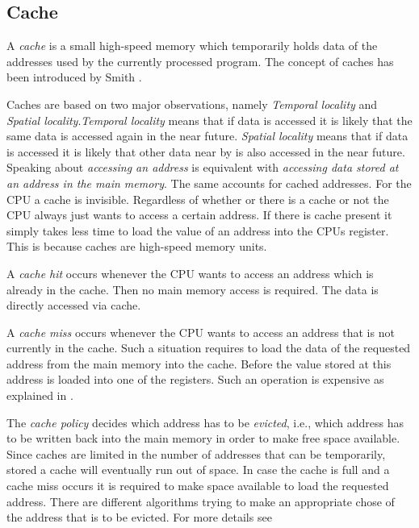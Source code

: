 \documentclass[onecolumn, openright, master, english, signatures]{dbrgrptt}
\begin{document}
\subsection{Cache}
A \emph{cache} is a small high-speed memory which temporarily holds data of the addresses used by the currently processed program. The concept of caches has been introduced by Smith \cite{smith1982cache}.

Caches are based on two major observations, namely \emph{Temporal locality} and \emph{Spatial locality}.\emph{Temporal locality} means that if data is accessed it is likely that the same data is accessed again in the near future. \emph{Spatial locality} means that if data is accessed it is likely that other data near by is also accessed in the near future. Speaking about \emph{accessing an address} is equivalent with \emph{accessing data stored at an address in the main memory}. The same accounts for cached addresses. For the \ac{CPU} a cache is invisible. Regardless of whether or there is a cache or not the \ac{CPU} always just wants to access a certain address. If there is cache present it simply takes less time to load the value of an address into the \ac{CPU}s register. This is because caches are high-speed memory units.

A \emph{cache hit} occurs whenever the \ac{CPU} wants to access an address which is already in the cache. Then no main memory access is required. The data is directly accessed via cache.

A \emph{cache miss} occurs whenever the \ac{CPU} wants to access an address that is not currently in the cache. Such a situation requires to load the data of the requested address from the main memory into the cache. Before the value stored at this address is loaded into one of the registers. Such an operation is expensive as explained in .

The \emph{cache policy} decides which address has to be \emph{evicted}, i.e., which address has to be written back into the main memory in order to make free space available. Since caches are limited in the number of addresses that can be temporarily, stored a cache will eventually run out of space. In case the cache is full and a cache miss occurs it is required to make space available to load the requested address. There are different algorithms trying to make an appropriate chose of the address that is to be evicted. For more details see 

\end{document}
